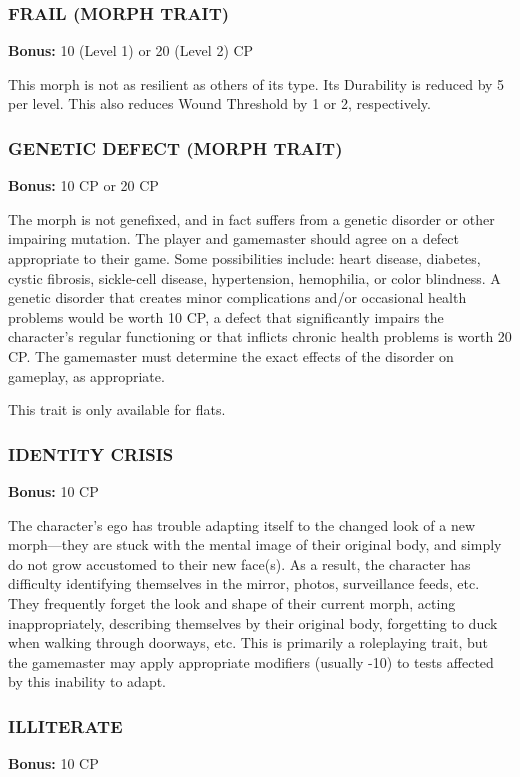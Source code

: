 \subsubsection{FRAIL (MORPH TRAIT)}
\textbf{Bonus:} 10 (Level 1) or 20 (Level 2) CP

This morph is not as resilient as others of its type.  Its Durability is
reduced by 5 per level. This also reduces Wound Threshold by 1 or 2,
respectively.

\subsubsection{GENETIC DEFECT (MORPH TRAIT)}
\textbf{Bonus:} 10 CP or 20 CP

The morph is not genefixed, and in fact suffers from a genetic disorder or
other impairing mutation.  The player and gamemaster should agree on a defect
appropriate to their game. Some possibilities include: heart disease, diabetes,
cystic fibrosis, sickle-cell disease, hypertension, hemophilia, or color
blindness.  A genetic disorder that creates minor complications and/or
occasional health problems would be worth 10 CP, a defect that significantly
impairs the character’s regular functioning or that inflicts chronic health
problems is worth 20 CP. The gamemaster must determine the exact effects of
the disorder on gameplay, as appropriate.

This trait is only available for flats.

\subsubsection{IDENTITY CRISIS}
\textbf{Bonus:} 10 CP

The character’s ego has trouble adapting itself to the changed look of a new
morph—they are stuck with the mental image of their original body, and simply
do not grow accustomed to their new face(s).  As a result, the character has
difficulty identifying themselves in the mirror, photos, surveillance feeds,
etc. They frequently forget the look and shape of their current morph, acting
inappropriately, describing themselves by their original body, forgetting to
duck when walking through doorways, etc. This is primarily a roleplaying
trait, but the gamemaster may apply appropriate modifiers (usually -10) to
tests affected by this inability to adapt.

\subsubsection{ILLITERATE}
\textbf{Bonus:} 10 CP


